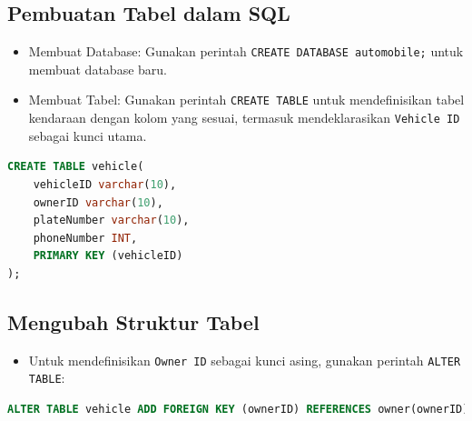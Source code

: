 \documentclass{article}
\begin{document}
\subsection{Pembuatan Tabel dalam SQL}
\begin{itemize}
    \item Membuat Database: Gunakan perintah \texttt{CREATE DATABASE automobile;} untuk membuat database baru.
    \item Membuat Tabel: Gunakan perintah \texttt{CREATE TABLE} untuk mendefinisikan tabel kendaraan dengan kolom yang sesuai, termasuk mendeklarasikan \texttt{Vehicle ID} sebagai kunci utama.
\end{itemize}
\begin{lstlisting}[language=SQL, caption={Contoh perintah untuk membuat tabel kendaraan}, captionpos=b]
CREATE TABLE vehicle(
    vehicleID varchar(10),
    ownerID varchar(10),
    plateNumber varchar(10),
    phoneNumber INT,
    PRIMARY KEY (vehicleID)
);
\end{lstlisting}

\subsection{Mengubah Struktur Tabel}
\begin{itemize}
    \item Untuk mendefinisikan \texttt{Owner ID} sebagai kunci asing, gunakan perintah \texttt{ALTER TABLE}:
\end{itemize}
\begin{lstlisting}[language=SQL, caption={}, captionpos=b]
ALTER TABLE vehicle ADD FOREIGN KEY (ownerID) REFERENCES owner(ownerID);
\end{lstlisting}
\end{document}
